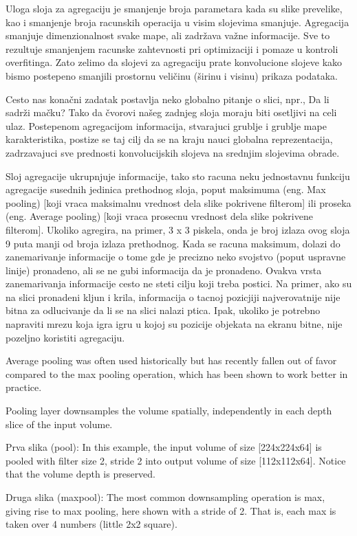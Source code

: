 \documentclass[a4paper]{article}
\begin{document}
Uloga sloja za agregaciju je smanjenje broja parametara kada su slike prevelike, kao i smanjenje broja racunskih operacija u visim slojevima smanjuje. Agregacija smanjuje dimenzionalnost svake mape, ali zadržava važne informacije. Sve to rezultuje smanjenjem racunske zahtevnosti pri optimizaciji i pomaze u kontroli overfitinga. Zato zelimo da slojevi za agregaciju prate konvolucione slojeve kako bismo postepeno smanjili prostornu veličinu (širinu i visinu) prikaza podataka.

Cesto nas konačni zadatak postavlja neko globalno pitanje o slici, npr., Da li sadrži mačku? Tako da čvorovi našeg zadnjeg sloja moraju biti osetljivi na celi ulaz. Postepenom agregacijom informacija, stvarajuci grublje i grublje mape karakteristika, postize se taj cilj da se na kraju nauci globalna reprezentacija, zadrzavajuci sve prednosti konvolucijskih slojeva na srednjim slojevima obrade.

Sloj agregacije ukrupnjuje informacije, tako sto racuna neku jednostavnu funkciju agregacije susednih jedinica prethodnog sloja, poput maksimuma (eng. Max pooling) [koji vraca maksimalnu vrednost dela slike pokrivene filterom] ili proseka (eng. Average pooling) [koji vraca prosecnu vrednost dela slike pokrivene filterom]. Ukoliko agregira, na primer, 3 x 3 piskela, onda je broj izlaza ovog sloja 9 puta manji od broja izlaza prethodnog. Kada se racuna maksimum, dolazi do zanemarivanje informacije o tome gde je precizno neko svojstvo (poput uspravne linije) pronadeno, ali se ne gubi informacija da je pronadeno. Ovakva vrsta zanemarivanja informacije cesto ne steti cilju koji treba postici. Na primer, ako su na slici pronadeni kljun i krila, informacija o tacnoj pozicjiji najverovatnije nije bitna za odlucivanje da li se na slici nalazi ptica. Ipak, ukoliko je potrebno napraviti mrezu koja igra igru u kojoj su pozicije objekata na ekranu bitne, nije pozeljno koristiti agregaciju.

 Average pooling was often used historically but has recently fallen out of favor compared to the max pooling operation, which has been shown to work better in practice.
 
 Pooling layer downsamples the volume spatially, independently in each depth slice of the input volume.
 
Prva slika (pool): In this example, the input volume of size [224x224x64] is pooled with filter size 2, stride 2 into output volume of size [112x112x64]. Notice that the volume depth is preserved.
 
Druga slika (maxpool): The most common downsampling operation is max, giving rise to max pooling, here shown with a stride of 2. That is, each max is taken over 4 numbers (little 2x2 square).
\end{document}
